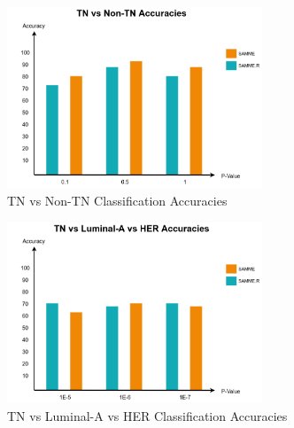 \documentclass[10pt,journal,compsoc]{IEEEtran}
\begin{document}
\begin{figure}
\centering
\includegraphics[width=3in]{acc1.png}
\caption{TN vs Non-TN Classification Accuracies}
\label{img5}
\end{figure}

\begin{figure}
\centering
\includegraphics[width=3in]{acc2.png}
\caption{TN vs Luminal-A vs HER Classification Accuracies}
\label{img6}
\end{figure}
% 
%   
% 
% 
% 
%  
% 
% 
% 
\end{document}
